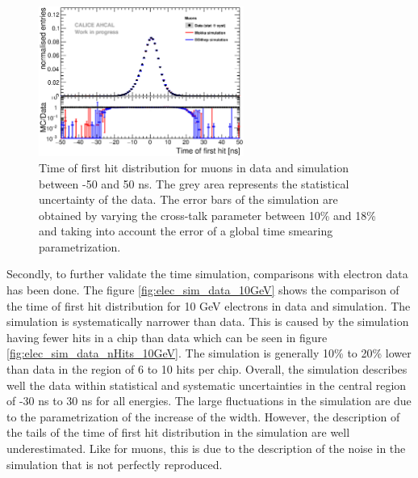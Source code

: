 \documentclass{JINST}
\begin{document}
\begin{figure}[htbp!]
	\centering
	\includegraphics[width=0.6\textwidth]{fig/Comparison_MokkaDD4hepData_Muons.eps}
	\caption{Time of first hit distribution for muons in data and simulation between -50 and 50 ns. The grey area represents the statistical uncertainty of the data. The error bars of the simulation are obtained by varying the cross-talk parameter between 10\% and 18\% and taking into account the error of a global time smearing parametrization.}
	\label{fig:sim_data_muon}
\end{figure}

Secondly, to further validate the time simulation, comparisons with electron data has been done. The figure \ref{fig:elec_sim_data_10GeV} shows the comparison of the time of first hit distribution for 10 GeV electrons in data and simulation. The simulation is systematically narrower than data. This is caused by the simulation having fewer hits in a chip than data which can be seen in figure \ref{fig:elec_sim_data_nHits_10GeV}. The simulation is generally 10\% to 20\% lower than data in the region of 6 to 10 hits per chip. Overall, the simulation describes well the data within statistical and systematic uncertainties in the central region of -30 ns to 30 ns for all energies. The large fluctuations in the simulation are due to the parametrization of the increase of the width. However, the description of the tails of the time of first hit distribution in the simulation are well underestimated. Like for muons, this is due to the description of the noise in the simulation that is not perfectly reproduced.
\end{document}
